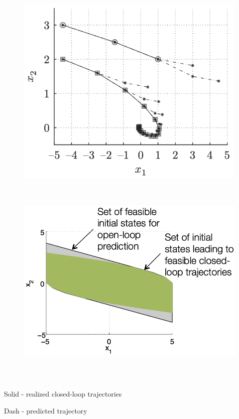 \documentclass[
  letterpaper,
  DIV=11,
  numbers=noendperiod,
  oneside]{scrartcl}
\begin{document}
\begin{figure}

\begin{minipage}{0.50\linewidth}
\includegraphics[width=\textwidth,height=3.64583in]{figs/mpc_closedlooptraj1.png}\end{minipage}%
%
\begin{minipage}{0.50\linewidth}
\includegraphics[width=\textwidth,height=4.16667in]{figs/mpc_closedlooptraj2.png}\end{minipage}%

\end{figure}%

Solid - realized closed-loop trajectories

Dash - predicted trajectory
\end{document}
